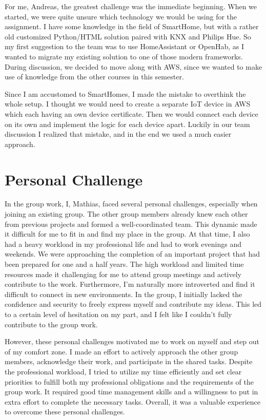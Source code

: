 For me, Andreas, the greatest challenge was the immediate beginning.
When we started, we were quite unsure which technology we would be using for the assignment.
I have some knowledge in the field of SmartHome, but with a rather old customized Python/HTML solution paired with KNX and Philips Hue.
So my first suggestion to the team was to use HomeAssistant or OpenHab, as I wanted to migrate my existing solution to one of those modern frameworks.
During discussion, we decided to move along with AWS, since we wanted to make use of knowledge from the other courses in this semester.

Since I am accustomed to SmartHomes, I made the mistake to overthink the whole setup.
I thought we would need to create a separate IoT device in AWS which each having an own device certificate.
Then we would connect each device on its own and implement the logic for each device apart.
Luckily in our team discussion I realized that mistake, and in the end we used a much easier approach.

\section{Personal Challenge}

In the group work, I, Mathias, faced several personal challenges, especially when joining an existing group. The other group members already knew each other from previous projects and formed a well-coordinated team. This dynamic made it difficult for me to fit in and find my place in the group.
At that time, I also had a heavy workload in my professional life and had to work evenings and weekends. We were approaching the completion of an important project that had been prepared for one and a half years. The high workload and limited time resources made it challenging for me to attend group meetings and actively contribute to the work.
Furthermore, I'm naturally more introverted and find it difficult to connect in new environments. In the group, I initially lacked the confidence and security to freely express myself and contribute my ideas. This led to a certain level of hesitation on my part, and I felt like I couldn't fully contribute to the group work.

However, these personal challenges motivated me to work on myself and step out of my comfort zone. I made an effort to actively approach the other group members, acknowledge their work, and participate in the shared tasks.
Despite the professional workload, I tried to utilize my time efficiently and set clear priorities to fulfill both my professional obligations and the requirements of the group work. It required good time management skills and a willingness to put in extra effort to complete the necessary tasks. Overall, it was a valuable experience to overcome these personal challenges.